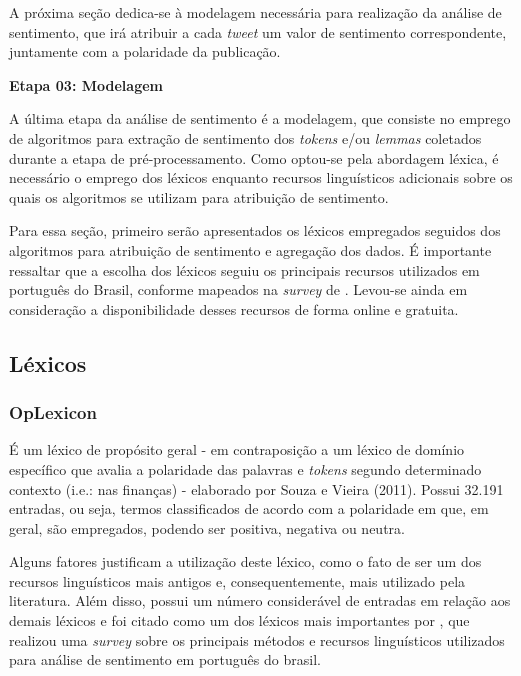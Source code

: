 A próxima seção dedica-se à modelagem necessária para realização da análise de sentimento, que irá atribuir a cada \textit{tweet} um valor de sentimento correspondente, juntamente com a polaridade da publicação.



\bigskip

\textbf{Etapa 03: Modelagem}

A última etapa da análise de sentimento é a modelagem, que consiste no emprego de algoritmos para extração de sentimento dos \textit{tokens} e/ou \textit{lemmas} coletados durante a etapa de pré-processamento. Como optou-se pela abordagem léxica, é necessário o emprego dos léxicos enquanto recursos linguísticos adicionais sobre os quais os algoritmos se utilizam para atribuição de sentimento. 

Para essa seção, primeiro serão apresentados os léxicos empregados seguidos dos algoritmos para atribuição de sentimento e agregação dos dados. É importante ressaltar que a escolha dos léxicos seguiu os principais recursos utilizados em português do Brasil, conforme mapeados na \textit{survey} de \textcite{pereira_survey_2021}. Levou-se ainda em consideração a disponibilidade desses recursos de forma online e gratuita.

\subsection{Léxicos}

\bigskip
\subsubsection{OpLexicon}

É um léxico de propósito geral - em contraposição a um léxico de domínio específico que avalia a polaridade das palavras e \textit{tokens} segundo determinado contexto (i.e.: nas finanças) - elaborado por Souza e Vieira (2011). Possui 32.191 entradas, ou seja, termos classificados de acordo com a polaridade em que, em geral, são empregados, podendo ser positiva, negativa ou neutra. 

Alguns fatores justificam a utilização deste léxico, como o fato de ser um dos recursos linguísticos mais antigos e, consequentemente, mais utilizado pela literatura. Além disso, possui um número considerável de entradas em relação aos demais léxicos e foi citado como um dos léxicos mais importantes por \textcite{pereira_survey_2021}, que realizou uma \textit{survey} sobre os principais métodos e recursos linguísticos utilizados para análise de sentimento em português do brasil. 

